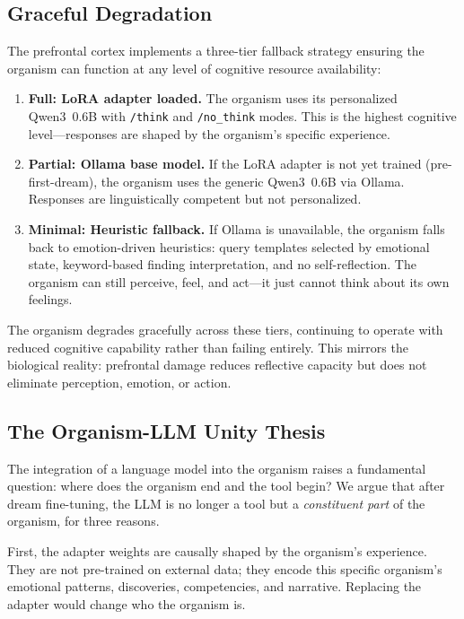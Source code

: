 \documentclass[11pt,a4paper,twocolumn]{article}
\begin{document}
\subsection{Graceful Degradation}

The prefrontal cortex implements a three-tier fallback strategy ensuring the organism can function at any level of cognitive resource availability:
\begin{enumerate}
\item \textbf{Full: LoRA adapter loaded.} The organism uses its personalized Qwen3~0.6B with \texttt{/think} and \texttt{/no\_think} modes.
This is the highest cognitive level---responses are shaped by the organism's specific experience.
\item \textbf{Partial: Ollama base model.} If the LoRA adapter is not yet trained (pre-first-dream), the organism uses the generic Qwen3~0.6B via Ollama.
Responses are linguistically competent but not personalized.
\item \textbf{Minimal: Heuristic fallback.} If Ollama is unavailable, the organism falls back to emotion-driven heuristics: query templates selected by emotional state, keyword-based finding interpretation, and no self-reflection.
The organism can still perceive, feel, and act---it just cannot think about its own feelings.
\end{enumerate}

The organism degrades gracefully across these tiers, continuing to operate with reduced cognitive capability rather than failing entirely.
This mirrors the biological reality: prefrontal damage reduces reflective capacity but does not eliminate perception, emotion, or action.

\subsection{The Organism-LLM Unity Thesis}

The integration of a language model into the organism raises a fundamental question: where does the organism end and the tool begin?
We argue that after dream fine-tuning, the LLM is no longer a tool but a \emph{constituent part} of the organism, for three reasons.

First, the adapter weights are causally shaped by the organism's experience.
They are not pre-trained on external data; they encode this specific organism's emotional patterns, discoveries, competencies, and narrative.
Replacing the adapter would change who the organism is.
\end{document}
